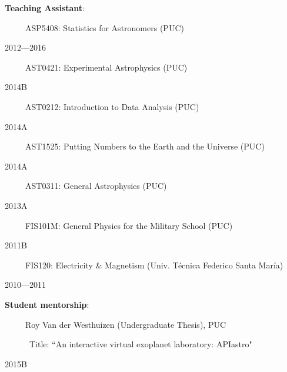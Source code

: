 \documentclass[11pt, a4paper]{article} %
\begin{document}
\begin{flushleft}%
  \setlength{\leftskip}{0.2cm}%
\textbf{Teaching Assistant}:
\end{flushleft}
\begin{minipage}[t]{0.6\textwidth}
\ \ \ \ \ ASP5408: Statistics for Astronomers (PUC)
\end{minipage}
\begin{minipage}[t]{0.4\textwidth}
\hfill 2012---2016
\end{minipage}
\begin{minipage}[t]{0.7\textwidth}
\ \ \ \ \ AST0421: Experimental Astrophysics (PUC)
\end{minipage}
\begin{minipage}[t]{0.3\textwidth}
\hfill 2014B
\end{minipage}
\begin{minipage}[t]{0.7\textwidth}
\ \ \ \ \ AST0212: Introduction to Data Analysis (PUC)
\end{minipage}
\begin{minipage}[t]{0.3\textwidth}
\hfill 2014A
\end{minipage}
\begin{minipage}[t]{0.7\textwidth}
\ \ \ \ \ AST1525: Putting Numbers to the Earth and the Universe (PUC)
\end{minipage}
\begin{minipage}[t]{0.3\textwidth}
\hfill 2014A
\end{minipage}
\begin{minipage}[t]{0.7\textwidth}
\ \ \ \ \ AST0311: General Astrophysics (PUC)
\end{minipage}
\begin{minipage}[t]{0.3\textwidth}
\hfill 2013A
\end{minipage}
\begin{minipage}[t]{0.7\textwidth}
\ \ \ \ \ FIS101M: General Physics for the Military School (PUC)
\end{minipage}
\begin{minipage}[t]{0.3\textwidth}
\hfill 2011B
\end{minipage}
\begin{minipage}[t]{0.7\textwidth}
\ \ \ \ \ FIS120: Electricity \& Magnetism (Univ. T\'ecnica Federico Santa Mar\'ia)
\end{minipage}
\begin{minipage}[t]{0.3\textwidth}
\hfill 2010---2011
\end{minipage}

\begin{flushleft}%
  \setlength{\leftskip}{0.2cm}%
\textbf{Student mentorship}:
\end{flushleft}

\begin{minipage}[t]{0.6\textwidth}
\ \ \ \ \ Roy Van der Westhuizen (Undergraduate Thesis), PUC

\ \ \ \ \ \ Title: ``An interactive virtual exoplanet laboratory: APIastro"
\end{minipage}
\begin{minipage}[t]{0.4\textwidth}
\hfill 2015B
\end{minipage}
\end{document}
